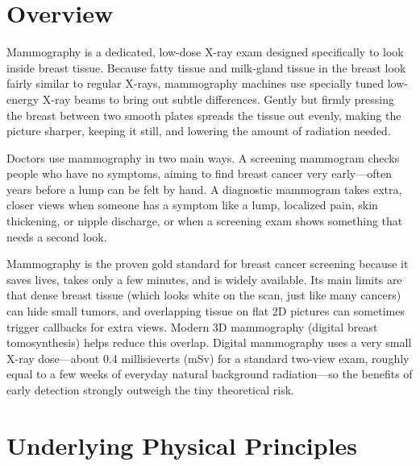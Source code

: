 \label{ch:infographic-mamography}

\section{Overview}

Mammography is a dedicated, low-dose X-ray exam designed specifically to look inside breast tissue. Because fatty tissue and milk-gland tissue in the breast look fairly similar to regular X-rays, mammography machines use specially tuned low-energy X-ray beams to bring out subtle differences. Gently but firmly pressing the breast between two smooth plates spreads the tissue out evenly, making the picture sharper, keeping it still, and lowering the amount of radiation needed.

Doctors use mammography in two main ways. A screening mammogram checks people who have no symptoms, aiming to find breast cancer very early---often years before a lump can be felt by hand. A diagnostic mammogram takes extra, closer views when someone has a symptom like a lump, localized pain, skin thickening, or nipple discharge, or when a screening exam shows something that needs a second look.

Mammography is the proven gold standard for breast cancer screening because it saves lives, takes only a few minutes, and is widely available. Its main limits are that dense breast tissue (which looks white on the scan, just like many cancers) can hide small tumors, and overlapping tissue on flat 2D pictures can sometimes trigger callbacks for extra views. Modern 3D mammography (digital breast tomosynthesis) helps reduce this overlap. Digital mammography uses a very small X-ray dose---about 0.4 millisieverts (mSv) for a standard two-view exam, roughly equal to a few weeks of everyday natural background radiation---so the benefits of early detection strongly outweigh the tiny theoretical risk.

\section{Underlying Physical Principles}


